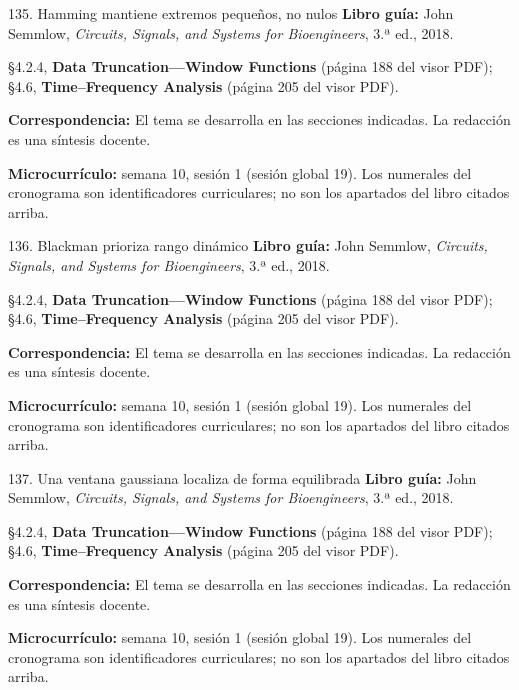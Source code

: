 \documentclass[
  10pt,
  ignorenonframetext,
  aspectratio=169,
  spanish,
]{beamer}
\begin{document}
\begin{frame}{135. Hamming mantiene extremos pequeños, no nulos}
\label{hamming-mantiene-extremos-pequeuxf1os-no-nulos}
\textbf{Libro guía:} John Semmlow, \emph{Circuits, Signals, and Systems
for Bioengineers}, 3.ª ed., 2018.

§4.2.4, \textbf{Data Truncation---Window Functions} (página 188 del
visor PDF); §4.6, \textbf{Time--Frequency Analysis} (página 205 del
visor PDF).

\textbf{Correspondencia:} El tema se desarrolla en las secciones
indicadas. La redacción es una síntesis docente.

\textbf{Microcurrículo:} semana 10, sesión 1 (sesión global 19). Los
numerales del cronograma son identificadores curriculares; no son los
apartados del libro citados arriba.
\end{frame}

\begin{frame}{136. Blackman prioriza rango dinámico}
\label{blackman-prioriza-rango-dinuxe1mico}
\textbf{Libro guía:} John Semmlow, \emph{Circuits, Signals, and Systems
for Bioengineers}, 3.ª ed., 2018.

§4.2.4, \textbf{Data Truncation---Window Functions} (página 188 del
visor PDF); §4.6, \textbf{Time--Frequency Analysis} (página 205 del
visor PDF).

\textbf{Correspondencia:} El tema se desarrolla en las secciones
indicadas. La redacción es una síntesis docente.

\textbf{Microcurrículo:} semana 10, sesión 1 (sesión global 19). Los
numerales del cronograma son identificadores curriculares; no son los
apartados del libro citados arriba.
\end{frame}

\begin{frame}{137. Una ventana gaussiana localiza de forma equilibrada}
\label{una-ventana-gaussiana-localiza-de-forma-equilibrada}
\textbf{Libro guía:} John Semmlow, \emph{Circuits, Signals, and Systems
for Bioengineers}, 3.ª ed., 2018.

§4.2.4, \textbf{Data Truncation---Window Functions} (página 188 del
visor PDF); §4.6, \textbf{Time--Frequency Analysis} (página 205 del
visor PDF).

\textbf{Correspondencia:} El tema se desarrolla en las secciones
indicadas. La redacción es una síntesis docente.

\textbf{Microcurrículo:} semana 10, sesión 1 (sesión global 19). Los
numerales del cronograma son identificadores curriculares; no son los
apartados del libro citados arriba.
\end{frame}
\end{document}
